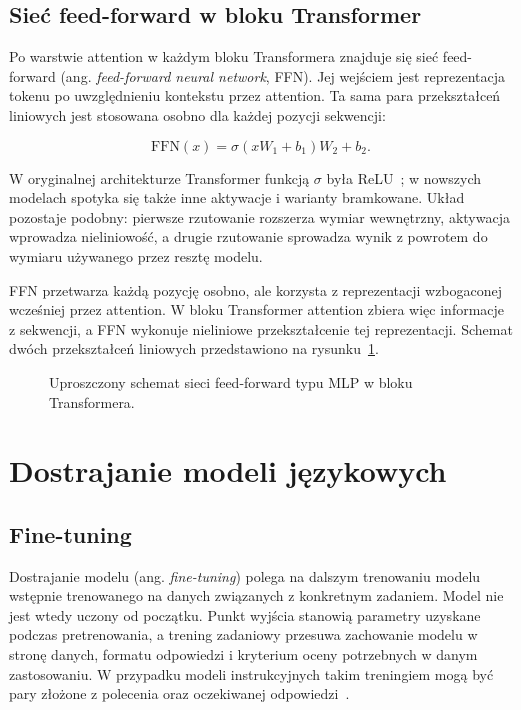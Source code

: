 \subsection{Sieć feed-forward w bloku Transformer}

Po warstwie attention w każdym bloku Transformera znajduje się sieć
feed-forward (ang. \emph{feed-forward neural network}, FFN). Jej wejściem jest
reprezentacja tokenu po uwzględnieniu kontekstu przez attention. Ta sama para
przekształceń liniowych jest stosowana osobno dla każdej pozycji sekwencji:

\[
\mathrm{FFN}(x)=\sigma(xW_1+b_1)W_2+b_2.
\]

W oryginalnej architekturze Transformer funkcją \(\sigma\) była
ReLU~\autocite{vaswani-attention-is-all-you-need}; w nowszych modelach spotyka
się także inne aktywacje i warianty bramkowane. Układ pozostaje podobny:
pierwsze rzutowanie rozszerza wymiar wewnętrzny, aktywacja wprowadza
nieliniowość, a drugie rzutowanie sprowadza wynik z powrotem do wymiaru
używanego przez resztę modelu.

FFN przetwarza każdą pozycję osobno, ale korzysta z reprezentacji wzbogaconej
wcześniej przez attention. W bloku Transformer attention zbiera więc informacje
z sekwencji, a FFN wykonuje nieliniowe przekształcenie tej reprezentacji.
Schemat dwóch przekształceń liniowych przedstawiono na
rysunku~\ref{fig:feed-forward-network}.

\begin{figure}[H]
\centering

\caption{Uproszczony schemat sieci feed-forward typu MLP w bloku Transformera.}
\label{fig:feed-forward-network}
\end{figure}

\section{Dostrajanie modeli językowych}

\subsection{Fine-tuning}

Dostrajanie modelu (ang. \emph{fine-tuning}) polega na dalszym trenowaniu
modelu wstępnie trenowanego na danych związanych z konkretnym zadaniem. Model nie
jest wtedy uczony od początku. Punkt wyjścia stanowią parametry uzyskane podczas
pretrenowania, a trening zadaniowy przesuwa zachowanie modelu w stronę danych,
formatu odpowiedzi i kryterium oceny potrzebnych w danym zastosowaniu. W
przypadku modeli instrukcyjnych takim treningiem mogą być pary złożone z
polecenia oraz oczekiwanej odpowiedzi~\autocite{ouyang-instruction-following}.

